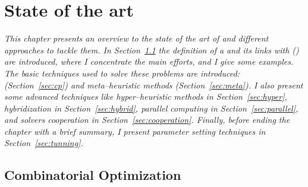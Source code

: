 \chapter{State of the art}
\label{chap:art}
\textit{This chapter presents an overview to the state of the art of \COPs{} and different approaches to tackle them. In Section~\ref{sec:combi} the definition of a \COP{} and its links with \CSPs{} (\csp) are introduced, where I concentrate the main efforts, and I give some examples. The basic techniques used to solve these problems are introduced: {\it \cp} (Section~\ref{sec:cp}) and {\it meta--heuristic methods} (Section~\ref{sec:meta}). I also present some advanced techniques like {\it hyper--heuristic methods} in Section~\ref{sec:hyper}, {\it hybridization} in Section~\ref{sec:hybrid}, {\it parallel computing} in Section~\ref{sec:parallel}, and {\it solvers cooperation} in Section~\ref{sec:cooperation}. Finally, before ending the chapter with a brief summary,  I present {\it parameter setting techniques} in Section~\ref{sec:tunning}.}
\vfill
\minitoc
\newpage



\section{Combinatorial Optimization}\label{sec:combi}


